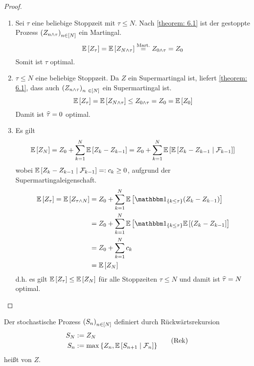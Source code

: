 \begin{proof}
	\begin{enumerate}[label=(zu \alph*), leftmargin=*]
		\item Sei $\tau$ eine beliebige Stoppzeit mit $\tau \le N$. Nach \cref{theorem: 6.1} ist der gestoppte Prozess $\left( Z_{n \land \tau} \right)_{n \in [N]}$ ein Martingal.
		\begin{equation*}
			\mathbb{E} \left[ Z_\tau \right] = \mathbb{E} \left[ Z_{N \land \tau} \right] \overset{\text{Mart.}}{=} Z_{0 \land \tau} = Z_0
		\end{equation*}
		Somit ist $\tau$ optimal.
		\item $\tau \le N$ eine beliebige Stoppzeit. Da $Z$ ein Supermartingal ist, liefert \cref{theorem: 6.1}, dass auch $\left( Z_{n \land \tau} \right)_{n \ \in [N]}$ ein Supermartingal ist.
		\begin{equation*}
			\mathbb{E} \left[ Z_\tau \right] = \mathbb{E} \left[ Z_{N \land \tau} \right] \le Z_{0 \land \tau} = Z_0 = \mathbb{E} \left[ Z_0 \right]
		\end{equation*}
		Damit ist $\widehat{\tau} = 0$ optimal.
		\item  Es gilt
		\begin{equation*}
			\mathbb{E} \left[ Z_N \right] = Z_0 + \sum_{k=1}^N \mathbb{E} \left[ Z_k - Z_{k-1} \right] 
			= Z_0 + \sum_{k=1}^N \mathbb{E} \left[ {\mathbb{E} \left[ Z_k - Z_{k-1} \mid \mathcal{F}_{k-1} \right]} \right]
		\end{equation*}
		wobei $\mathbb{E} \left[ Z_k - Z_{k-1} \mid \mathcal{F}_{k-1} \right] \mathrel{=:} c_k \ge 0$, aufgrund der Supermartingaleigenschaft. 
		\begin{equation*}
			\begin{aligned}
				\EW[Z_\tau] 
				= \EW[Z_{\tau \land N}] 
				&= Z_0 + \sum_{k=1}^N \EW[\one_{\menge{k \le \tau}}(Z_k - Z_{k-1})] \\
				&=  Z_0 + \sum_{k=1}^N \EW[\one_{\menge{k \le \tau}} {\EW[(Z_k - Z_{k-1}]}] \\
				&= Z_0 + \sum_{k=1}^N c_k \\ 
				&= \EW[Z_N]
			\end{aligned}
		\end{equation*}
		d.h. es gilt $\mathbb{E} \left[ Z_\tau \right] \le \mathbb{E} \left[ Z_N \right]$ für alle Stoppzeiten $\tau \le N$ und damit ist $\widehat{\tau} = N$ optimal.
	\end{enumerate}
\end{proof}

\begin{*definition}
	Der stochastische Prozess $\left( S_n \right)_{n \in [N]}$ definiert durch Rückwärtsrekursion
	\begin{equation*}
		\begin{aligned}
			S_N &\mathrel{:=} Z_N \\
			S_n &\mathrel{:=} \max\left\{ Z_n , \mathbb{E} \left[ S_{n+1} \mid \mathcal{F}_n \right] \right\}
		\end{aligned}
		\tag{Rek} \label{eq: snell-rek}
	\end{equation*}
	heißt  von $Z$.
\end{*definition}

